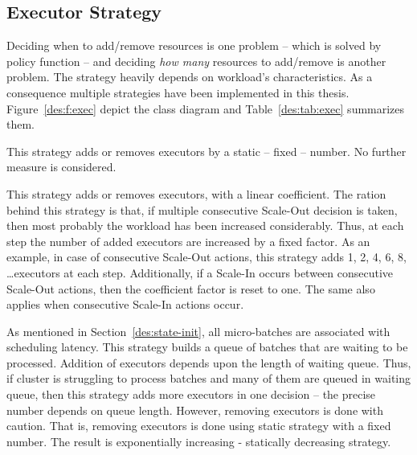 \subsection{Executor Strategy}
Deciding when to add/remove resources is one problem -- which is solved by policy function -- and deciding \emph{how many} resources to add/remove is another problem. The strategy heavily depends on workload's characteristics. As a consequence multiple strategies have been implemented in this thesis. Figure~\ref{des:f:exec} depict the class diagram and Table~\ref{des:tab:exec} summarizes them.
\begin{description}[leftmargin=0pt]
    \item[Static Strategy] This strategy adds or removes executors by a static -- fixed -- number. No further measure is considered.
    \item[Linear Strategy] This strategy adds or removes executors, with a linear coefficient. The ration behind this strategy is that, if multiple consecutive Scale-Out decision is taken, then most probably the workload has been increased considerably. Thus, at each step the number of added executors are increased by a fixed factor. As an example, in case of consecutive Scale-Out actions, this strategy adds 1, 2, 4, 6, 8, \dots executors at each step. Additionally, if a Scale-In occurs between consecutive Scale-Out actions, then the coefficient factor is reset to one. The same also applies when consecutive Scale-In actions occur. 
    \item[Queue Aware Strategy] As mentioned in Section~\ref{des:state-init}, all micro-batches are associated with scheduling latency. This strategy builds a queue of batches that are waiting to be processed. Addition of executors depends upon the length of waiting queue. Thus, if cluster is struggling to process batches and many of them are queued in waiting queue, then this strategy adds more executors in one decision -- the precise number depends on queue length. However, removing executors is done with caution. That is, removing executors is done using static strategy with a fixed number. The result is exponentially increasing - statically decreasing strategy.
\end{description}
